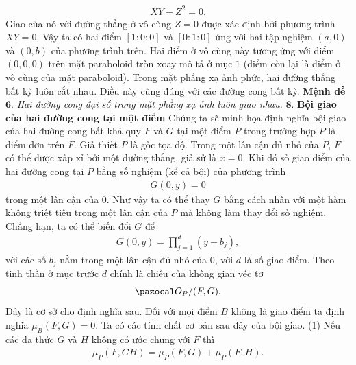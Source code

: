 \begin{multicols}{2}
	\begin{align*}
		XY-Z^2=0.
	\end{align*}
	Giao của nó với đường thẳng ở vô cùng $Z=0$ được xác định bởi phương trình
	$XY=0.$
	Vậy ta có hai điểm $[1:0:0]$ và $[0:1:0]$ ứng với hai tập nghiệm $(a,0)$ và $(0,b)$ của phương trình trên. Hai điểm ở vô cùng này tương ứng với điểm $(0,0,0)$ trên mặt paraboloid tròn xoay mô tả ở mục $1$ (điểm còn lại là điểm ở vô cùng của mặt paraboloid).   
	\vskip 0.1cm
	Trong mặt phẳng xạ ảnh phức, hai đường thẳng bất kỳ luôn cắt nhau. Điều này cũng đúng với các đường cong bất kỳ. 
	\vskip 0.1cm
	\textbf{\color{duongvaotoanhoc}Mệnh đề} $\pmb{6.}$
	\textit{Hai đường cong đại số trong mặt phẳng xạ ảnh luôn giao nhau.}
	\vskip 0.1cm
	$\pmb{8.}$ \textbf{\color{duongvaotoanhoc}Bội giao của hai đường cong tại một điểm} 
	\vskip 0.1cm 
	Chúng ta sẽ minh họa định nghĩa bội giao của hai đường cong bất khả quy $F$  và $G$  tại một điểm $P$ trong trường hợp $P$ là điểm đơn trên $F$.  Giả thiết $P$ là gốc tọa độ. Trong một lân cận đủ nhỏ của $P$, $F$  có thể được xấp xỉ bởi một đường thẳng, giả sử là $x=0$. Khi đó số giao điểm của hai đường cong tại $P$ bằng số nghiệm (kể cả bội) của phương trình 
	\begin{align*}
		G(0,y)=0
	\end{align*}
	trong một lân cận của $0$. Như vậy ta có thể thay $G$ bằng cách nhân với một hàm không triệt tiêu trong một lân cận của $P$ mà không làm thay đổi số nghiệm. Chẳng hạn, ta có thể biến đổi $G$ để 
	\begin{align*}
		G(0,y)=\prod_{j=1}^d(y-b_j),
	\end{align*}
	với các số $b_j$ nằm trong một lân cận đủ nhỏ của $0$, với $d$ là số giao điểm. Theo tinh thần ở mục trước $d$ chính là chiều của không gian véc tơ
	\begin{align*}
		\pazocal O_P/(F,G).
	\end{align*}
	Đây là cơ sở cho định nghĩa sau.
	\vskip 0.2cm
	\vskip 0.05cm
	Đối với mọi điểm $B$ không là giao điểm ta định nghĩa
	$\mu_B(F,G)=0.$ 
	Ta có các tính  chất cơ bản sau đây của bội giao. 
	\vskip 0.1cm
	($1$) Nếu các đa thức $G$ và $H$ không có ước chung với $F$ thì
	\setlength{\abovedisplayskip}{7pt}
	\setlength{\belowdisplayskip}{7pt} 
	\begin{align*}
		\mu_P(F,GH)=\mu_P(F,G)+\mu_P(F,H).

\end{align*}
\end{multicols}
